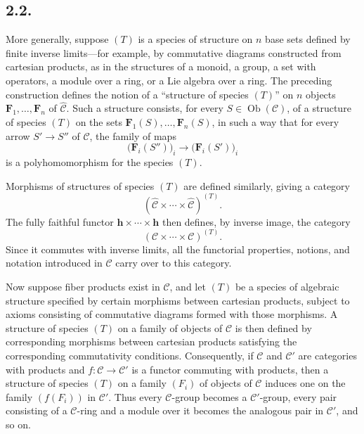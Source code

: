 \subsection*{2.2.}

More generally, suppose \((T)\) is a species of structure on \(n\) base sets
defined by finite inverse limits---for example, by commutative diagrams
constructed from cartesian products, as in the structures of a monoid, a
group, a set with operators, a module over a ring, or a Lie algebra over a
ring. The preceding construction defines the notion of a ``structure of
species \((T)\)'' on \(n\) objects
\(\mathbf F_1,\ldots,\mathbf F_n\) of \(\widehat{\mathscr C}\). Such a
structure consists, for every \(S\in\operatorname{Ob}(\mathscr C)\), of a
structure of species \((T)\) on the sets
\(\mathbf F_1(S),\ldots,\mathbf F_n(S)\), in such a way that for every arrow
\(S'\to S''\) of \(\mathscr C\), the family of maps
\[
  \bigl(\mathbf F_i(S'')\bigr)_i
  \longrightarrow
  \bigl(\mathbf F_i(S')\bigr)_i
\]
is a polyhomomorphism for the species \((T)\).

Morphisms of structures of species \((T)\) are defined similarly, giving a
category
\[
  (\widehat{\mathscr C}\times\cdots\times\widehat{\mathscr C})^{(T)}.
\]
The fully faithful functor \(\mathbf h\times\cdots\times\mathbf h\) then
defines, by inverse image, the category
\[
  (\mathscr C\times\cdots\times\mathscr C)^{(T)}.
\]
Since it commutes with inverse limits, all the functorial properties,
notions, and notation introduced in \(\widehat{\mathscr C}\) carry over to
this category.

Now suppose fiber products exist in \(\mathscr C\), and let \((T)\) be a
species of algebraic structure specified by certain morphisms between
cartesian products, subject to axioms consisting of commutative diagrams
formed with those morphisms. A structure of species \((T)\) on a family of
objects of \(\mathscr C\) is then defined by corresponding morphisms between
cartesian products satisfying the corresponding commutativity conditions.
Consequently, if \(\mathscr C\) and \(\mathscr C'\) are categories with
products and \(f:\mathscr C\to\mathscr C'\) is a functor commuting with
products, then a structure of species \((T)\) on a family
\((F_i)\) of objects of \(\mathscr C\) induces one on the family
\((f(F_i))\) in \(\mathscr C'\). Thus every \(\mathscr C\)-group becomes a
\(\mathscr C'\)-group, every pair consisting of a \(\mathscr C\)-ring and a
module over it becomes the analogous pair in \(\mathscr C'\), and so on.

